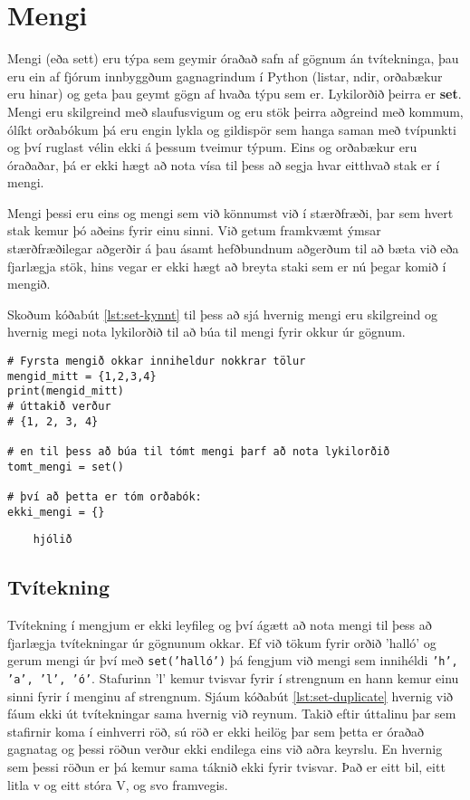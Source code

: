 
\chapter{Mengi}\label{k:sett}
Mengi (eða sett) eru týpa sem geymir óraðað safn af gögnum án tvítekninga, þau eru ein af fjórum innbyggðum gagnagrindum í Python (listar, ndir, orðabækur eru hinar) og geta þau geymt gögn af hvaða týpu sem er.
Lykilorðið þeirra er \textbf{set}.
Mengi eru skilgreind með slaufusvigum og eru stök þeirra aðgreind með kommum, ólíkt orðabókum þá eru engin lykla og gildispör sem hanga saman með tvípunkti og því ruglast vélin ekki á þessum tveimur týpum.
Eins og orðabækur eru óraðaðar, þá er ekki hægt að nota vísa til þess að segja hvar eitthvað stak er í mengi.

Mengi þessi eru eins og mengi sem við könnumst við í stærðfræði, þar sem hvert stak kemur þó aðeins fyrir einu sinni.
Við getum framkvæmt ýmsar stærðfræðilegar aðgerðir á þau ásamt hefðbundnum aðgerðum til að bæta við eða fjarlægja stök, hins vegar er ekki hægt að breyta staki sem er nú þegar komið í mengið.

Skoðum kóðabút \ref{lst:set-kynnt} til þess að sjá hvernig mengi eru skilgreind og hvernig megi nota lykilorðið til að búa til mengi fyrir okkur úr gögnum.

\begin{lstlisting}[caption=Mengi skilgreind, label=lst:set-kynnt]
# Fyrsta mengið okkar inniheldur nokkrar tölur
mengid_mitt = {1,2,3,4}
print(mengid_mitt)
# úttakið verður 
# {1, 2, 3, 4}

# en til þess að búa til tómt mengi þarf að nota lykilorðið
tomt_mengi = set()

# því að þetta er tóm orðabók:
ekki_mengi = {}
\end{lstlisting}
\lstset{style=uttak}
\begin{lstlisting}
	hjólið
\end{lstlisting}
\lstset{style=venjulegt}

\section{Tvítekning}
Tvítekning í mengjum er ekki leyfileg og því ágætt að nota mengi til þess að fjarlægja tvítekningar úr gögnunum okkar.
Ef við tökum fyrir orðið 'halló' og gerum mengi úr því með \texttt{set('halló')} þá fengjum við mengi sem innihéldi \texttt{'h', 'a', 'l', 'ó'}.
Stafurinn 'l' kemur tvisvar fyrir í strengnum en hann kemur einu sinni fyrir í menginu af strengnum.
Sjáum kóðabút \ref{lst:set-duplicate} hvernig við fáum ekki út tvítekningar sama hvernig við reynum.
Takið eftir úttalinu þar sem stafirnir koma í einhverri röð, sú röð er ekki heilög þar sem þetta er óraðað gagnatag og þessi röðun verður ekki endilega eins við aðra keyrslu.
En hvernig sem þessi röðun er þá kemur sama táknið ekki fyrir tvisvar.
Það er eitt bil, eitt litla v og eitt stóra V, og svo framvegis.

